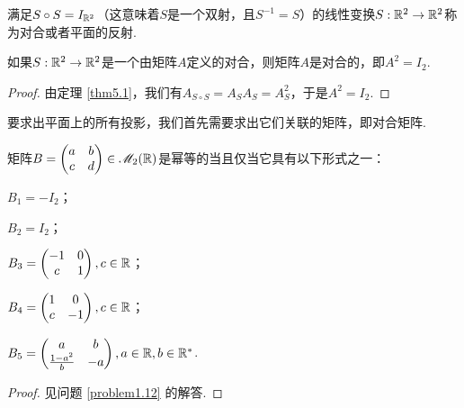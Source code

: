 \begin{definition}
  满足$S\circ S=I_{\mathbb R^2}$（这意味着$S$是一个双射，且$S^{-1}=S$）的线性变换$S:\mathbb R^2\to\mathbb R^2$称为对合或者平面的{\kaishu 反射}.
\end{definition}

\begin{theorem}
  如果$S:\mathbb R^2\to\mathbb R^2$是一个由矩阵$A$定义的对合，则矩阵$A$是对合的，即$A^2=I_2$.
\end{theorem}
\begin{proof}
  由定理 \ref{thm5.1}，我们有$A_{S\circ S}=A_SA_S=A_S^2$，于是$A^2=I_2$.
\end{proof}

要求出平面上的所有投影，我们首先需要求出它们关联的矩阵，即对合矩阵.

\begin{mybox}
  \begin{theorem}[实对合矩阵.]

    矩阵$B=\begin{pmatrix}
      a & b \\
      c & d
    \end{pmatrix}\in\mathscr M_2(\mathbb R)$是幂等的当且仅当它具有以下形式之一：
    \begin{enum}
      \item $B_1=-I_2$；
      \item $B_2=I_2$；
      \item $B_3=\begin{pmatrix}
        -1 & 0 \\
        c & 1
      \end{pmatrix},c\in\mathbb R$；
      \item $B_4=\begin{pmatrix}
        1 & 0 \\
        c & -1
      \end{pmatrix},c\in\mathbb R$；
      \item $B_5=\begin{pmatrix}
        a & b \\
        \frac{1-a^2}b & -a
      \end{pmatrix},a\in\mathbb R,b\in\mathbb R^\ast$.
    \end{enum}
  \end{theorem}
\end{mybox}
\begin{proof}
  见问题 \ref{problem1.12} 的解答.
\end{proof}

